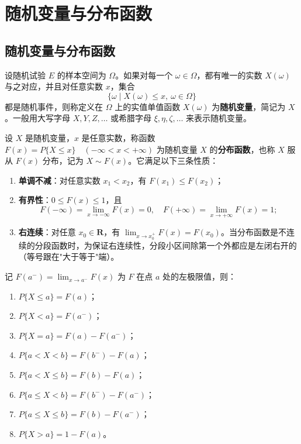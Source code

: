 \documentclass[lang=cn,11pt]{elegantbook}
\begin{document}
\section{随机变量与分布函数}

\subsection{随机变量与分布函数}

\begin{definition}[随机变量] \label{def:random-variable}
设随机试验 \(E\) 的样本空间为 \(\Omega\)。如果对每一个 \(\omega \in \Omega\)，都有唯一的实数 \(X(\omega)\) 与之对应，并且对任意实数 \(x\)，集合
\[
\{\omega \mid X(\omega) \le x,\ \omega \in \Omega\}
\]
都是随机事件，则称定义在 \(\Omega\) 上的实值单值函数 \(X(\omega)\) 为\textbf{随机变量}，简记为 \(X\)。一般用大写字母 \(X, Y, Z, \dots\) 或希腊字母 \(\xi, \eta, \zeta, \dots\) 来表示随机变量。
\end{definition}

\begin{definition}[分布函数] \label{def:distribution-function}
设 \(X\) 是随机变量，\(x\) 是任意实数，称函数
\(
F(x) = P\{X \le x\} \quad (-\infty < x < +\infty)
\)
为随机变量 \(X\) 的\textbf{分布函数}，也称 \(X\) 服从 \(F(x)\) 分布，记为 \(X \sim F(x)\)。它满足以下三条性质：
\begin{enumerate}
    \item \textbf{单调不减}：对任意实数 \(x_1 < x_2\)，有 \(F(x_1) \le F(x_2)\)；
    \item \textbf{有界性}：\(0 \le F(x) \le 1\)，且
    \[
    F(-\infty) = \lim_{x \to -\infty} F(x) = 0, \quad F(+\infty) = \lim_{x \to +\infty} F(x) = 1;
    \]
    \item \textbf{右连续}：对任意 \(x_0 \in \mathbf{R}\)，有 \(\lim_{x \to x_0^+} F(x) = F(x_0)\)。当分布函数是不连续的分段函数时，为保证右连续性，分段小区间除第一个外都应是左闭右开的（等号跟在"大于等于"端）。
\end{enumerate}
记 \(F(a^-) = \lim_{x \to a^-} F(x)\) 为 \(F\) 在点 \(a\) 处的左极限值，则：
\begin{enumerate}
    \item \(P\{X \le a\} = F(a)\)；
    \item \(P\{X < a\} = F(a^-)\)；
    \item \(P\{X = a\} = F(a) - F(a^-)\)；
    \item \(P\{a < X < b\} = F(b^-) - F(a)\)；
    \item \(P\{a < X \le b\} = F(b) - F(a)\)；
    \item \(P\{a \le X < b\} = F(b^-) - F(a^-)\)；
    \item \(P\{a \le X \le b\} = F(b) - F(a^-)\)；
    \item \(P\{X > a\} = 1 - F(a)\)。
\end{enumerate}
\end{definition}
\end{document}
